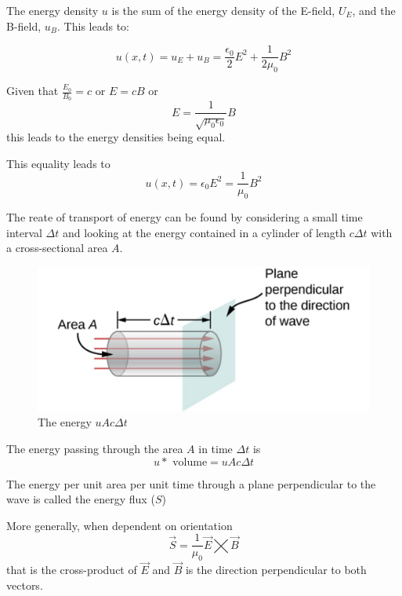 \documentclass[14pt]{memoir}
\begin{document}
The energy density $u$ is the sum of the energy density of the E-field, $U_E$, and the B-field, $u_B$. This leads to:

\begin{equation}
u(x,t) = u_E + u_B = \frac{\epsilon_0}{2}  E^2 + \frac{1}{2 \mu_0} B^2
\end{equation}

Given that $\frac{E_0}{B_0} = c$ or $E = cB$ or
\begin{equation}
E = \frac{1}{\sqrt{\mu_0 \epsilon_0}} B
\end{equation}
this leads to the energy densities being equal.

This equality leads to
\begin{equation}
u(x,t) =  \epsilon_0  E^2 = \frac{1}{\mu_0} B^2
\end{equation}

The reate of transport of energy can be found by considering a small time interval $\Delta t$ and looking at the energy contained in a cylinder of length $c \Delta t$ with a cross-sectional area $A$.

\begin{figure}[H]
\begin{center}
\includegraphics[scale=0.5]{fig/fig_16_11.jpg}
\caption{The energy $u A c \Delta t$}
\label{fig:16_11}
\end{center}
\end{figure}

The energy passing through the area $A$ in time $\Delta t$ is
\begin{equation}
u * \text{ volume} = uAc \Delta t
\end{equation}

The energy per unit area per unit time through a plane perpendicular to the wave is called the energy flux ($S$)

More generally, when dependent on orientation 
\begin{equation}
\vec{S} = \frac{1}{\mu_0}\vec{E} \bigtimes \vec{B}
\end{equation}
that is the cross-product of $\vec{E}$ and $\vec{B}$ is the direction perpendicular to both vectors. 
\end{document}
